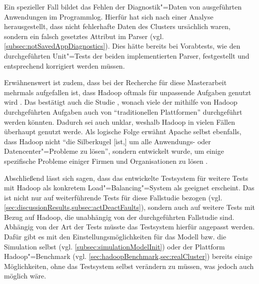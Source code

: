 Ein spezieller Fall bildet das Fehlen der Diagnostik"=Daten von ausgeführten Anwendungen im Programmlog.
Hierfür hat sich nach einer Analyse herausgestellt, dass nicht fehlerhafte Daten des Clusters ursächlich waren, sondern ein falsch gesetztes Attribut im Parser (vgl. \cref{subsec:notSavedAppDiagnostics}).
Dies hätte bereits bei Vorabtests, wie den durchgeführten Unit"=Tests der beiden implementierten Parser, festgestellt und entsprechend korrigiert werden müssen.

Erwähnenswert ist zudem, dass bei der Recherche für diese Masterarbeit mehrmals aufgefallen ist, dass Hadoop oftmals für unpassende Aufgaben genutzt wird \cite{Ren2013,Vavilapalli2013}.
Das bestätigt auch die Studie \cite{HadoopDataTypes}, wonach viele der mithilfe von Hadoop durchgeführten Aufgaben auch von \enquote{traditionellen Plattformen} durchgeführt werden könnten.
Dadurch sei auch unklar, weshalb Hadoop in vielen Fällen überhaupt genutzt werde.
Als logische Folge erwähnt Apache selbst ebenfalls, dass Hadoop nicht \enquote{die Silberkugel [ist,] um alle Anwendungs- oder Datencenter"=Probleme zu lösen}, sondern entwickelt wurde, um einige spezifische Probleme einiger Firmen und Organisationen zu lösen \cite{HadoopIsNot}.

Abschließend lässt sich sagen, dass das entwickelte Testsystem für weitere Tests mit Hadoop als konkretem Load"=Balancing"=System als geeignet erscheint.
Das ist nicht nur auf weiterführende Tests für diese Fallstudie bezogen (vgl. \cref{sec:discussionResults,subsec:actDeactFaults}), sondern auch auf weitere Tests mit Bezug auf Hadoop, die unabhängig von der durchgeführten Fallstudie sind.
Abhängig von der Art der Tests müsste das Testsystem  hierfür angepasst werden.
Dafür gibt es mit den Einstellungsmöglichkeiten für das Modell bzw. die Simulation selbst (vgl. \cref{subsec:simulationModelInit}) oder der Plattform Hadoop"=Benchmark (vgl. \cref{sec:hadoopBenchmark,sec:realCluster}) bereits einige Möglichkeiten, ohne das Testsystem selbst verändern zu müssen, was jedoch auch möglich wäre.
